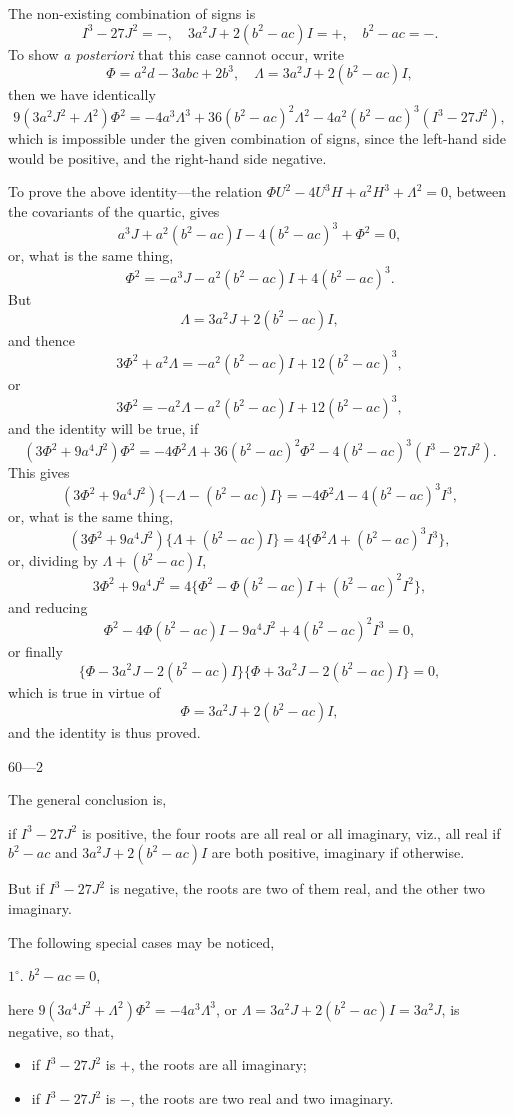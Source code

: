 \documentclass[11pt,a4paper]{book}
\begin{document}
The non-existing combination of signs is
\[
I^3 - 27J^2 = -,\quad 3a^2J + 2(b^2 - ac)I = +,\quad b^2 - ac = -.
\]
To show \textit{a posteriori} that this case cannot occur, write
\[
\Phi = a^2d - 3abc + 2b^3,\quad \Lambda = 3a^2J + 2(b^2 - ac)I,
\]
then we have identically
\[
9(3a^2J^2 + \Lambda^2)\Phi^2 = -4a^3\Lambda^3 + 36(b^2 - ac)^2\Lambda^2 - 4a^2(b^2 - ac)^3(I^3 - 27J^2),
\]
which is impossible under the given combination of signs, since the left-hand side would be positive, and the right-hand side negative.

To prove the above identity---the relation $\Phi U^2 - 4U^3H + a^2H^3 + \Lambda^2 = 0$, between the covariants of the quartic, gives
\[
a^3J + a^2(b^2 - ac)I - 4(b^2 - ac)^3 + \Phi^2 = 0,
\]
or, what is the same thing,
\[
\Phi^2 = -a^3J - a^2(b^2 - ac)I + 4(b^2 - ac)^3.
\]
But
\[
\Lambda = 3a^2J + 2(b^2 - ac)I,
\]
and thence
\[
3\Phi^2 + a^2\Lambda = -a^2(b^2 - ac)I + 12(b^2 - ac)^3,
\]
or
\[
3\Phi^2 = -a^2\Lambda - a^2(b^2 - ac)I + 12(b^2 - ac)^3,
\]
and the identity will be true, if
\[
(3\Phi^2 + 9a^4J^2)\Phi^2 = -4\Phi^2\Lambda + 36(b^2 - ac)^2\Phi^2 - 4(b^2 - ac)^3(I^3 - 27J^2).
\]
This gives
\[
(3\Phi^2 + 9a^4J^2)\{-\Lambda - (b^2 - ac)I\} = -4\Phi^2\Lambda - 4(b^2 - ac)^3I^3,
\]
or, what is the same thing,
\[
(3\Phi^2 + 9a^4J^2)\{\Lambda + (b^2 - ac)I\} = 4\{\Phi^2\Lambda + (b^2 - ac)^3I^3\},
\]
or, dividing by $\Lambda + (b^2 - ac)I$,
\[
3\Phi^2 + 9a^4J^2 = 4\{\Phi^2 - \Phi(b^2 - ac)I + (b^2 - ac)^2I^2\},
\]
and reducing
\[
\Phi^2 - 4\Phi(b^2 - ac)I - 9a^4J^2 + 4(b^2 - ac)^2I^3 = 0,
\]
or finally
\[
\{\Phi - 3a^2J - 2(b^2 - ac)I\}\{\Phi + 3a^2J - 2(b^2 - ac)I\} = 0,
\]
which is true in virtue of
\[
\Phi = 3a^2J + 2(b^2 - ac)I,
\]
and the identity is thus proved.

\hfill 60---2

The general conclusion is,

if $I^3 - 27J^2$ is positive, the four roots are all real or all imaginary, viz., all real if $b^2 - ac$ and $3a^2J + 2(b^2 - ac)I$ are both positive, imaginary if otherwise.

But if $I^3 - 27J^2$ is negative, the roots are two of them real, and the other two imaginary.

The following special cases may be noticed,

$1^\circ$. $b^2 - ac = 0$,

here $9(3a^4J^2 + \Lambda^2)\Phi^2 = -4a^3\Lambda^3$, or $\Lambda = 3a^2J + 2(b^2 - ac)I = 3a^2J$, is negative, so that,
\begin{itemize}
    \item if $I^3 - 27J^2$ is $+$, the roots are all imaginary;
    \item if $I^3 - 27J^2$ is $-$, the roots are two real and two imaginary.
\end{itemize}
\end{document}

